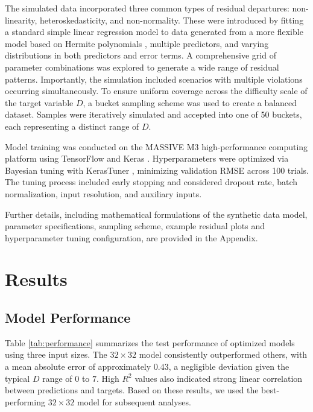 \documentclass[]{interact}
\theoremstyle{plain}%
\theoremstyle{definition}
\theoremstyle{remark}
\begin{document}
The simulated data incorporated three common types of residual
departures: non-linearity, heteroskedasticity, and non-normality. These
were introduced by fitting a standard simple linear regression model to
data generated from a more flexible model based on Hermite polynomials
\citep{hermite1864nouveau}, multiple predictors, and varying
distributions in both predictors and error terms. A comprehensive grid
of parameter combinations was explored to generate a wide range of
residual patterns. Importantly, the simulation included scenarios with
multiple violations occurring simultaneously. To ensure uniform coverage
across the difficulty scale of the target variable \(D\), a bucket
sampling scheme was used to create a balanced dataset. Samples were
iteratively simulated and accepted into one of 50 buckets, each
representing a distinct range of \(D\).

Model training was conducted on the MASSIVE M3 high-performance
computing platform \citep{goscinski2014multi} using TensorFlow
\citep{abadi2016tensorflow} and Keras \citep{chollet2015keras}.
Hyperparameters were optimized via Bayesian tuning with KerasTuner
\citep{omalley2019kerastuner}, minimizing validation RMSE across 100
trials. The tuning process included early stopping and considered
dropout rate, batch normalization, input resolution, and auxiliary
inputs.

Further details, including mathematical formulations of the synthetic
data model, parameter specifications, sampling scheme, example residual
plots and hyperparameter tuning configuration, are provided in the
Appendix.

\section{Results}\label{sec-model-results}

\subsection{Model Performance}\label{model-performance}

Table \ref{tab:performance} summarizes the test performance of optimized
models using three input sizes. The \(32 \times 32\) model consistently
outperformed others, with a mean absolute error of approximately
\(0.43\), a negligible deviation given the typical \(D\) range of \(0\)
to \(7\). High \(R^2\) values also indicated strong linear correlation
between predictions and targets. Based on these results, we used the
best-performing \(32 \times 32\) model for subsequent analyses.
\end{document}
